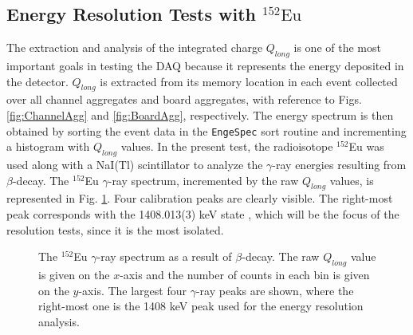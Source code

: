 \subsection{Energy Resolution Tests with $^{152}\mathrm{Eu}$} \label{subsec:energy_resolution}

The extraction and analysis of the integrated charge $Q_{long}$ is one of the most important goals in testing the DAQ because it represents the energy deposited in the detector. $Q_{long}$ is extracted from its memory location in each event collected over all channel aggregates and board aggregates, with reference to Figs. \ref{fig:ChannelAgg} and \ref{fig:BoardAgg}, respectively. The energy spectrum is then obtained by sorting the event data in the \texttt{EngeSpec} sort routine and incrementing a histogram with $Q_{long}$ values. In the present test, the radioisotope $^{152}$Eu was used along with a NaI(Tl) scintillator to analyze the $\gamma$-ray energies resulting from $\beta$-decay. The $^{152}$Eu $\gamma$-ray spectrum, incremented by the raw $Q_{long}$ values, is represented in Fig. \ref{fig:Eu152_spectrum}. Four calibration peaks are clearly visible. The right-most peak corresponds with the 1408.013(3) keV state \cite{IAEA2007}, which will be the focus of the resolution tests, since it is the most isolated. 

\begin{figure}[t]
\centering
{}
\caption{\label{fig:Eu152_spectrum}The $^{152}$Eu $\gamma$-ray spectrum as a result of $\beta$-decay. The raw $Q_{long}$ value is given on the $x$-axis and the number of counts in each bin is given on the $y$-axis. The largest four $\gamma$-ray peaks are shown, where the right-most one is the 1408 keV peak used for the energy resolution analysis.}
\end{figure}

